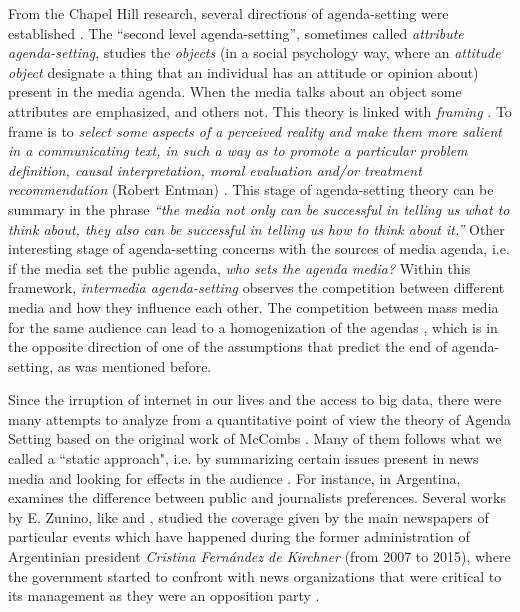 \documentclass[10pt,letterpaper]{article}
\begin{document}
\par From the Chapel Hill research, several directions of agenda-setting were established \cite{mccombs2005look}.
The ``second level agenda-setting'', sometimes called \textit{attribute agenda-setting}, studies the \textit{objects} (in a social psychology way, where an \textit{attitude object} designate a thing that an individual has an attitude or opinion about) present in the media agenda. When the media talks about an object some attributes are emphasized, and others not. 
This theory is linked with \textit{framing} \cite{guggenheim2015dynamics, tsur2015frame}. 
To frame is to \textit{select some aspects of a perceived reality and make them more salient in a communicating text, in such a way as to promote a particular problem definition, causal interpretation, moral evaluation and/or treatment recommendation} (Robert Entman) \cite{mccombs2005look}.
This stage of agenda-setting theory can be summary in the phrase \textit{``the media not only can be successful in telling us what to think about, they also can be successful in telling us how to think about it.''} 
Other interesting stage of agenda-setting concerns with the sources of media agenda, i.e. if the media set the public agenda, \textit{who sets the agenda media?} Within this framework, \textit{intermedia agenda-setting} observes the competition between different media and how they influence each other. The competition between mass media for the same audience can lead to a homogenization of the agendas \cite{vargo2017networks}, which is in the opposite direction of one of the assumptions that predict the end of agenda-setting, as was mentioned before.


\par Since the irruption of internet in our lives and the access to big data, there were many attempts to analyze from a quantitative point of view the theory of Agenda Setting based on  the original work of McCombs \cite{mccombs1972agenda}. Many of them follows what we called a ``static approach", i.e. by summarizing certain issues present in news media and looking for effects in the audience \cite{brians1996campaign, gerber2009does, coleman2007young}.
For instance, in Argentina, \cite{mitchelstein2016brecha} examines the difference between public and journalists preferences. 
Several works by E. Zunino, like \cite{zunino2010cobertura} and \cite{koziner2013cobertura}, studied the coverage given by the main newspapers of particular events which have happened during the former administration of Argentinian president \emph{Cristina Fern\'andez de Kirchner} (from 2007 to 2015), where the government started to confront with news organizations that were critical to its management as they were an opposition party \cite{mitchelstein2017information}.
\end{document}
